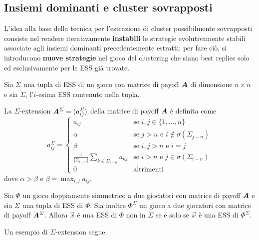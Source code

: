 \subsection{Insiemi dominanti e cluster sovrapposti}

L'idea alla base della tecnica per l'estrazione di cluster possibilmente sovrapposti consiste nel rendere iterativamente \textbf{instabili} le strategie evolutivamente stabili associate agli insiemi dominanti precedentemente estratti: per fare ciò, si introducono \textbf{nuove strategie} nel gioco del clustering che siano best replies solo ed esclusivamente per le ESS già trovate.

Sia $\Sigma$ una tupla di ESS di un gioco con matrice di payoff $\mat{A}$ di dimensione $n \times n$ e sia $\Sigma_i$ l'$i$-esima ESS contenuto nella tupla.

La $\Sigma$-extension $\mat{A}^\Sigma = (a_{ij}^\Sigma)$ della matrice di payoff $\mat{A}$ è definita come
\begin{displaymath}
	a_{ij}^\Sigma = \begin{cases}
		a_{ij} & \text{se } i, j \in \{1, \dots, n\} \\
		\alpha & \text{se } j > n \text{ e } i \notin \sigma(\Sigma_{j - n}) \\
		\beta & \text{se } i, j > n \text{ e } i = j \\
		\frac{1}{|\Sigma_{i - n}|} \sum_{k \in \Sigma_{i - n}} a_{kj} & \text{se } i > n \text{ e } j \in \sigma(\Sigma_{i - n}) \\
		0 & \text{altrimenti}
	\end{cases}
\end{displaymath}
dove $\alpha > \beta$ e $\beta = \max_{i, j} a_{ij}$.

\begin{thm}
	Sia $\Phi$ un gioco doppiamente simmetrico a due giocatori con matrice di payoff $\mat{A}$ e sia $\Sigma$ una tupla di ESS di $\Phi$. Sia inoltre $\Phi^\Sigma$ un gioco a due giocatori con matrice di payoff $\mat{A}^\Sigma$. Allora $\vec{x}$ è una ESS di $\Phi$ non in $\Sigma$ se e solo se $\vec{x}$ è una ESS di $\Phi^\Sigma$.
\end{thm}

\noindent Un esempio di $\Sigma$-extension segue.

